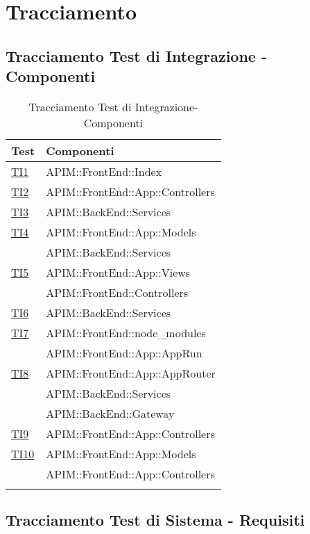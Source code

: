 \newpage
\section{Tracciamento}

\subsection{Tracciamento Test di Integrazione - Componenti}

\normalsize
\begin{longtable}{|>{\centering}m{5cm}|m{7cm}<{\centering}|}
	\hline \rowcolor{Gray}
	\textbf{Test} & \textbf{Componenti}\\
	\hline
	\endhead
	\hyperlink{TI1}{TI1} & APIM::FrontEnd::Index \\ \hline
	\hyperlink{TI2}{TI2} & APIM::FrontEnd::App::Controllers \\ \hline
	\hyperlink{TI3}{TI3} & APIM::BackEnd::Services \\ \hline
	\hyperlink{TI4}{TI4} & APIM::FrontEnd::App::Models\\&APIM::BackEnd::Services \\ \hline
	\hyperlink{TI5}{TI5} & APIM::FrontEnd::App::Views\\&APIM::FrontEnd::Controllers \\ \hline
	\hyperlink{TI6}{TI6} & APIM::BackEnd::Services \\ \hline
	\hyperlink{TI7}{TI7} & APIM::FrontEnd::node\_modules\\&APIM::FrontEnd::App::AppRun \\ \hline
	\hyperlink{TI8}{TI8} & APIM::FrontEnd::App::AppRouter\\&APIM::BackEnd::Services\\&APIM::BackEnd::Gateway \\ \hline
	\hyperlink{TI9}{TI9} & APIM::FrontEnd::App::Controllers \\ \hline
	\hyperlink{TI10}{TI10} & APIM::FrontEnd::App::Models\\&APIM::FrontEnd::App::Controllers \\ \hline
	
	\caption[Tracciamento Test di Integrazione-Componenti]{Tracciamento Test di Integrazione-Componenti}
	\label{tabella:ti-componenti}
\end{longtable}
\clearpage

\subsection{Tracciamento Test di Sistema - Requisiti}

